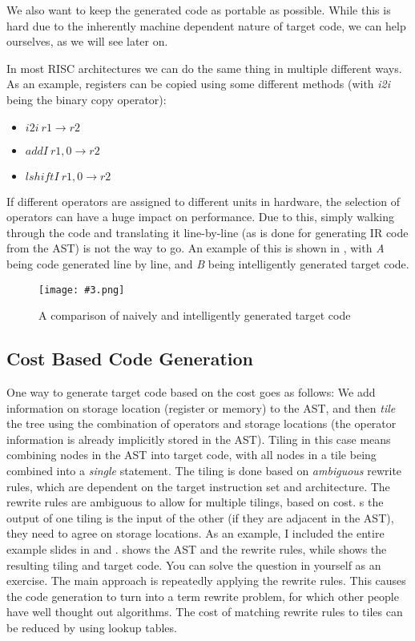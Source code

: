 \documentclass{article}
\newcommand{\fig}[4]{
	\begin{figure}[#1]
		\center
		\texttt{[image: \#3.png]}
		\caption{#4}
		\label{fig:#3}
	\end{figure}
	}
\begin{document}
We also want to keep the generated code as portable as possible.
While this is hard due to the inherently machine dependent nature of target code, we can help ourselves, as we will see later on.

In most RISC architectures we can do the same thing in multiple different ways.
As an example, registers can be copied using some different methods (with \emph{i2i} being the binary copy operator):
\begin{itemize}
	\item $i2i\ r1 \rightarrow r2$
	\item $addI\ r1, 0 \rightarrow r2$
	\item $lshiftI\ r1, 0 \rightarrow r2$
\end{itemize}
If different operators are assigned to different units in hardware, the selection of operators can have a huge impact on performance.
Due to this, simply walking through the code and translating it line-by-line (as is done for generating IR code from the AST) is not the way to go.
An example of this is shown in , with \emph{A} being code generated line by line, and \emph{B} being intelligently generated target code.

\fig{h}{}{codegeneration}{A comparison of naively and intelligently generated target code}

\subsection{Cost Based Code Generation}
One way to generate target code based on the cost goes as follows:
We add information on storage location (register or memory) to the AST, and then \emph{tile} the tree using the combination of operators and storage locations (the operator information is already implicitly stored in the AST).
Tiling in this case means combining nodes in the AST into target code, with all nodes in a tile being combined into a \emph{single} statement.
The tiling is done based on \emph{ambiguous} rewrite rules, which are dependent on the target instruction set and architecture.
The rewrite rules are ambiguous to allow for multiple tilings, based on cost.
s the output of one tiling is the input of the other (if they are adjacent in the AST), they need to agree on storage locations.
As an example, I included the entire example slides in  and .
 shows the AST and the rewrite rules, while  shows the resulting tiling and target code.
You can solve the question in  yourself as an exercise.
The main approach is repeatedly applying the rewrite rules.
This causes the code generation to turn into a term rewrite problem, for which other people have well thought out algorithms.
The cost of matching rewrite rules to tiles can be reduced by using lookup tables.
\end{document}
